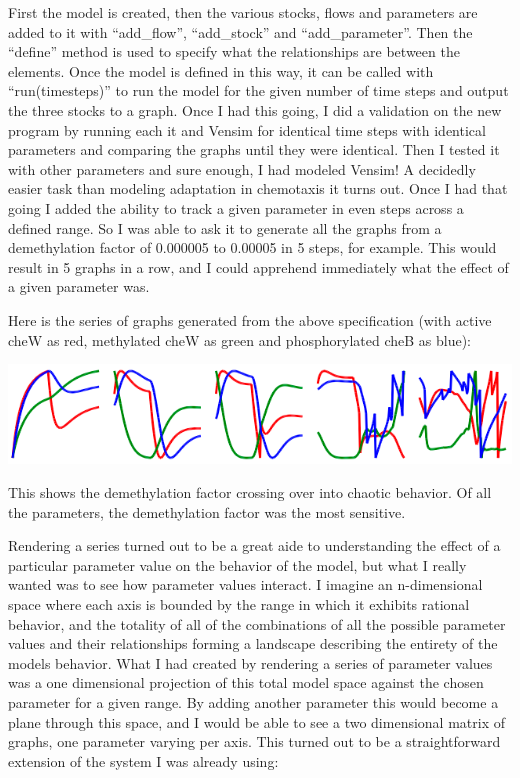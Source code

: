 \documentclass[12pt]{article}
\begin{document}
First the model is created, then the various stocks, flows and parameters are added to it with ``add\_flow'', ``add\_stock'' and ``add\_parameter''.  Then the ``define'' method is used to specify what the relationships are between the elements.  Once the model is defined in this way, it can be called with ``run(timesteps)'' to run the model for the given number of time steps and output the three stocks to a graph.  Once I had this going, I did a validation on the new program by running each it and Vensim for identical time steps with identical parameters and comparing the graphs until they were identical.  Then I tested it with other parameters and sure enough, I had modeled Vensim!  A decidedly easier task than modeling adaptation in chemotaxis it turns out.  Once I had that going I added the ability to track a given parameter in even steps across a defined range.  So I was able to ask it to generate all the graphs from a demethylation factor of 0.000005 to 0.00005 in 5 steps, for example.  This would result in 5 graphs in a row, and I could apprehend immediately what the effect of a given parameter was.  

Here is the series of graphs generated from the above specification (with active cheW as red, methylated cheW as green and phosphorylated cheB as blue):

\includegraphics[scale=0.55]{seriesthree.png}

This shows the demethylation factor crossing over into chaotic behavior.  Of all the parameters, the demethylation factor was the most sensitive.

Rendering a series turned out to be a great aide to understanding the effect of a particular parameter value on the behavior of the model, but what I really wanted was to see how parameter values interact.  I imagine an n-dimensional space where each axis is bounded by the range in which it exhibits rational behavior, and the totality of all of the combinations of all the possible parameter values and their relationships forming a landscape describing the entirety of the models behavior.  What I had created by rendering a series of parameter values was a one dimensional projection of this total model space against the chosen parameter for a given range.  By adding another parameter this would become a plane through this space, and I would be able to see a two dimensional matrix of graphs, one parameter varying per axis.  This turned out to be a straightforward extension of the system I was already using:
\end{document}
